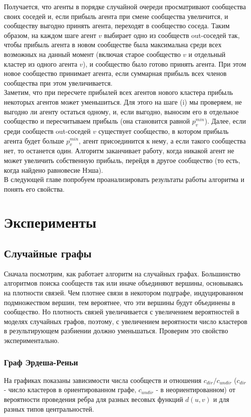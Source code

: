 Получается, что агенты в порядке случайной очереди просматривают сообщества своих соседей и, если прибыль агента при смене сообщества увеличится, и сообществу выгодно принять агента, переходят в сообщество соседа. Таким образом, на каждом шаге агент $v$ выбирает одно из сообществ out-соседей так, чтобы прибыль агента в новом сообществе была максимальна среди всех возможных на данный момент (включая старое сообщество $v$ и отдельный кластер из одного агента $v$), и сообщество было готово принять агента. При этом новое сообщество принимает агента, если суммарная прибыль всех членов сообщества при этом увеличивается.\\

Заметим, что при пересчете прибылей всех агентов нового кластера прибыль некоторых агентов может уменьшиться. Для этого на шаге (i) мы проверяем, не выгодно ли агенту остаться одному, и, если выгодно, выносим его в отдельное сообщество и пересчитываем прибыль (она становится равной $p_v^{min}$). Далее, если среди сообществ out-соседей $v$ существует сообщество, в котором прибыль агента будет больше $p_v^{min}$, агент присоединится к нему, а если такого сообщества нет, то останется один. Алгоритм заканчивает работу, когда никакой агент не может увеличить собственную прибыль, перейдя в другое сообщество (то есть, когда найдено равновесие Нэша).\\

В следующей главе попробуем проанализировать результаты работы алгоритма и понять его свойства.

\chapter{Эксперименты}
\section{Случайные графы}
Сначала посмотрим, как работает алгоритм на случайных графах. Большинство алгоритмов поиска сообществ так или иначе объединяют вершины, основываясь на плотности связей. Чем плотнее связи в некотором подграфе, индуцированном подмножеством вершин, тем вероятнее, что эти вершины будут объединены в сообщество. Но плотность связей увеличивается с увеличением вероятностей в моделях случайных графов, поэтому, с увеличением вероятности число кластеров в  результирующем разбиении должно уменьшаться. Проверим это свойство экспериментально.

\subsection{Граф Эрдеша-Реньи}
На графиках показаны зависимости числа сообществ и отношения $c_{dir}/c_{undir}$ ($c_{dir}$ - число кластеров в ориентированном графе, $c_{undir}$ - в неориентированном) от вероятности проведения ребра для разных весовых функций $d(u, v)$ и для разных типов центральностей.\\

